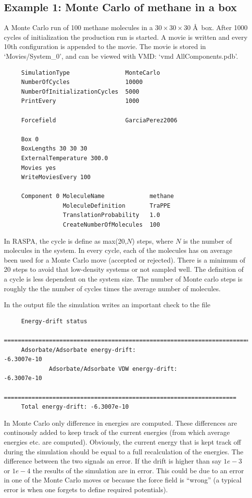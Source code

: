 \subsection*{Example 1: Monte Carlo of methane in a box}
A Monte Carlo run of 100 methane molecules in a $30\times30\times30$ \AA\ box.
After 1000 cycles of initialization the production run is started.
A movie is written and every 10th configuration is appended to the movie. 
The movie is stored in `Movies/System\_0',
and can be viewed with VMD: `vmd AllComponents.pdb'.

\begin{tiny}
\begin{verbatim}
     SimulationType                MonteCarlo
     NumberOfCycles                10000
     NumberOfInitializationCycles  5000
     PrintEvery                    1000
     
     Forcefield                    GarciaPerez2006
     
     Box 0
     BoxLengths 30 30 30
     ExternalTemperature 300.0
     Movies yes
     WriteMoviesEvery 100
     
     Component 0 MoleculeName             methane
                 MoleculeDefinition       TraPPE
                 TranslationProbability   1.0
                 CreateNumberOfMolecules  100

\end{verbatim}
\end{tiny}

In RASPA, the cycle is define as max(20,$N$) steps, where $N$ is the number of molecules in the system. In every cycle, each of the molecules
has on average been used for a Monte Carlo move (accepted or rejected). There is a minimum of 20 steps to avoid that low-density
systems or not sampled well. The definition of a cycle is less dependent on the system size. The number of Monte carlo steps
is roughly the the number of cycles times the average number of molecules.

In the output file the simulation writes an important check to the file
\begin{tiny}
\begin{verbatim}
     Energy-drift status
     ===========================================================================
     Adsorbate/Adsorbate energy-drift:                                     -6.3007e-10
             Adsorbate/Adsorbate VDW energy-drift:                               -6.3007e-10
     ===================================================================
     Total energy-drift: -6.3007e-10
\end{verbatim}
\end{tiny}
In Monte Carlo only difference in energies are computed. These differences are continously added to keep track of the current energies
(from which average energies etc. are computed). Obviously, the current energy that is kept track off during the simulation should
be equal to a full recalculation of the energies. The difference between the two signals an error. If the drift is higher than
say $1e-3$ or $1e-4$ the results of the simulation are in error. This could be due to an error in one of the Monte Carlo moves
or because the force field is ``wrong'' (a typical error is when one forgets to define required potentials).

